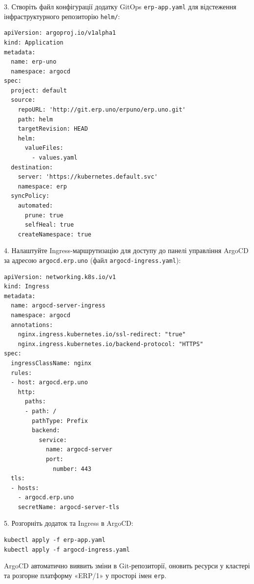\documentclass{article}
\begin{document}
3. Створіть файл конфігурації додатку GitOps \texttt{erp-app.yaml} для відстеження інфраструктурного репозиторію \texttt{helm/}:
\begin{lstlisting}
apiVersion: argoproj.io/v1alpha1
kind: Application
metadata:
  name: erp-uno
  namespace: argocd
spec:
  project: default
  source:
    repoURL: 'http://git.erp.uno/erpuno/erp.uno.git'
    path: helm
    targetRevision: HEAD
    helm:
      valueFiles:
        - values.yaml
  destination:
    server: 'https://kubernetes.default.svc'
    namespace: erp
  syncPolicy:
    automated:
      prune: true
      selfHeal: true
    createNamespace: true
\end{lstlisting}

4. Налаштуйте Ingress-маршрутизацію для доступу до панелі управління ArgoCD за адресою \texttt{argocd.erp.uno} (файл \texttt{argocd-ingress.yaml}):
\begin{lstlisting}
apiVersion: networking.k8s.io/v1
kind: Ingress
metadata:
  name: argocd-server-ingress
  namespace: argocd
  annotations:
    nginx.ingress.kubernetes.io/ssl-redirect: "true"
    nginx.ingress.kubernetes.io/backend-protocol: "HTTPS"
spec:
  ingressClassName: nginx
  rules:
  - host: argocd.erp.uno
    http:
      paths:
      - path: /
        pathType: Prefix
        backend:
          service:
            name: argocd-server
            port:
              number: 443
  tls:
  - hosts:
    - argocd.erp.uno
    secretName: argocd-server-tls
\end{lstlisting}

5. Розгорніть додаток та Ingress в ArgoCD:
\begin{lstlisting}
kubectl apply -f erp-app.yaml
kubectl apply -f argocd-ingress.yaml
\end{lstlisting}

ArgoCD автоматично виявить зміни в Git-репозиторії, оновить ресурси у кластері та розгорне платформу «ERP/1» у просторі імен \texttt{erp}.
\end{document}
